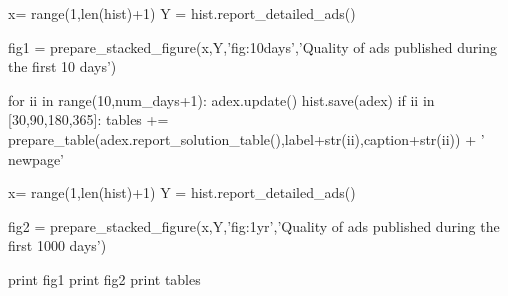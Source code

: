 \documentclass[letterpaper,10pt]{article}
\begin{document}
\begin{python}
x= range(1,len(hist)+1)
Y = hist.report_detailed_ads()

fig1 = prepare_stacked_figure(x,Y,'fig:10days','Quality of ads published during the first 10 days')

for ii in range(10,num_days+1):
    adex.update()
    hist.save(adex)
    if ii in [30,90,180,365]:
        tables += prepare_table(adex.report_solution_table(),label+str(ii),caption+str(ii)) + '\n\\newpage\n'

x= range(1,len(hist)+1)
Y = hist.report_detailed_ads()

fig2 = prepare_stacked_figure(x,Y,'fig:1yr','Quality of ads published during the first 1000 days')

print fig1
print fig2
print tables
\end{python}
\end{document}
